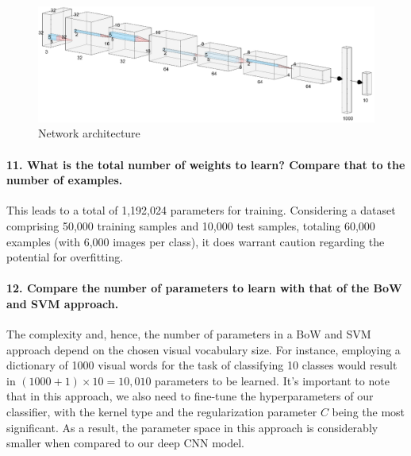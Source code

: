 \begin{figure}[H]
    \centering
    \includegraphics*[width=\textwidth]{figs/AlexNet_style_log.png}
    \caption{Network architecture}
    \label{fig:AlexNetstylelog}
\end{figure}

\paragraph{11. What is the total number of weights to learn? Compare that to the number of examples.}
This leads to a total of 1,192,024 parameters for training. Considering a dataset comprising 50,000 training samples and 10,000 test samples, totaling 60,000 examples (with 6,000 images per class), it does warrant caution regarding the potential for overfitting.

\paragraph{12. Compare the number of parameters to learn with that of the BoW and SVM approach.}
The complexity and, hence, the number of parameters in a BoW and SVM approach depend on the chosen visual vocabulary size. For instance, employing a dictionary of 1000 visual words for the task of classifying 10 classes would result in \( (1000 + 1) \times 10 = 10,010 \) parameters to be learned. It's important to note that in this approach, we also need to fine-tune the hyperparameters of our classifier, with the kernel type and the regularization parameter \( C \) being the most significant. As a result, the parameter space in this approach is considerably smaller when compared to our deep CNN model.

